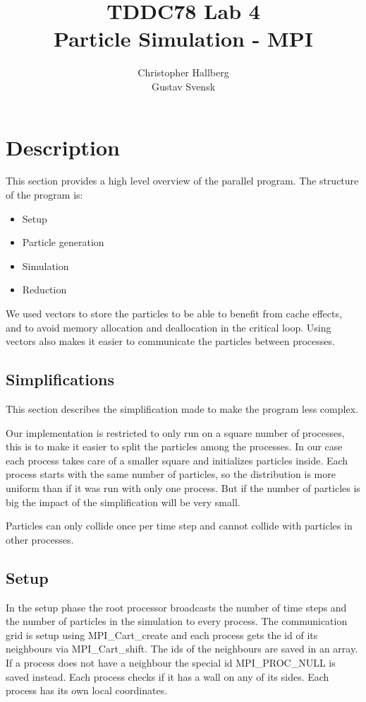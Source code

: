 \documentclass[a4paper, 12pt]{article}
\begin{document}
\title{TDDC78 Lab 4\\
        Particle Simulation - MPI}
\author{Christopher Hallberg \\
        Gustav Svensk}
\maketitle

\thispagestyle{empty}

\newpage
\setcounter{page}{1}
\tableofcontents
\newpage

\section{Description}
This section provides a high level overview of the parallel program.
The structure of the program is:
\begin{itemize}
\item Setup
\item Particle generation
\item Simulation
\item Reduction
\end{itemize}

We used vectors to store the particles to be able to benefit from cache effects,
and to avoid memory allocation and deallocation in the critical loop.
Using vectors also makes it easier to communicate the particles between processes.

\subsection{Simplifications}
This section describes the simplification made to make the program less complex.

Our implementation is restricted to only run on a square number of processes,
this is to make it easier to split the particles among the processes. In our case
each process takes care of a smaller square and initializes particles inside.
Each process starts with the same number of particles, so the distribution is
more uniform than if it was run with only one process. But if the number of
particles is big the impact of the simplification will be very small.

Particles can only collide once per time step and cannot collide with particles
in other processes.

\subsection{Setup}
In the setup phase the root processor broadcasts the number of time steps and
the number of particles in the simulation to every process. The communication
grid is setup using MPI\_Cart\_create and each process gets the id of its
neighbours via MPI\_Cart\_shift. The ids of the neighbours are saved in an
array. If a process does not have a neighbour the special id MPI\_PROC\_NULL is
saved instead. Each process checks if it has a wall on any of its sides. 
Each process has its own local coordinates.
\end{document}
